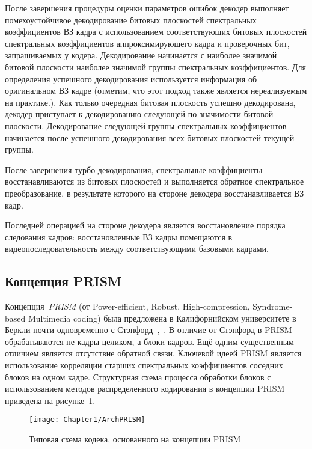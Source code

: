 После завершения процедуры оценки параметров ошибок декодер выполняет помехоустойчивое декодирование битовых плоскостей спектральных коэффициентов ВЗ кадра с использованием соответствующих битовых плоскостей спектральных коэффициентов аппроксимирующего кадра и проверочных бит, запрашиваемых у кодера. Декодирование начинается с наиболее значимой битовой плоскости наиболее значимой группы спектральных коэффициентов. Для определения успешного декодирования используется информация об оригинальном ВЗ кадре (отметим, что этот подход также является нереализуемым на практике.). Как только очередная битовая плоскость успешно декодирована, декодер приступает к декодированию следующей по значимости битовой плоскости. Декодирование следующей группы спектральных коэффициентов начинается после успешного декодирования всех битовых плоскостей текущей группы.

После завершения турбо декодирования, спектральные коэффициенты восстанавливаются из битовых плоскостей и выполняется обратное спектральное преобразование, в результате которого на стороне декодера восстанавливается ВЗ кадр.

Последней операцией на стороне декодера является восстановление порядка следования кадров: восстановленные ВЗ кадры помещаются в видеопоследовательность между соответствующими базовыми кадрами.

\subsection{Концепция PRISM}
\label{chap:1:4:2}

Концепция~\textit{PRISM} (от Power-efficient, Robust, High-compression, Syndrome-based Multimedia coding) была предложена в Калифорнийском университете в Беркли почти одновременно с Стэнфорд~\cite{Puri2003},~\cite{Puri2007}. В отличие от Стэнфорд в PRISM обрабатываются не кадры целиком, а блоки кадров. Ещё одним существенным отличием является отсутствие обратной связи. Ключевой идеей PRISM является использование корреляции старших спектральных коэффициентов соседних блоков на одном кадре. Структурная схема процесса обработки блоков с использованием методов распределенного кодирования в концепции PRISM приведена на рисунке~\ref{fig:ArchPRISM}.

\begin{figure}[htbp]
\begin{center}
\texttt{[image: Chapter1/ArchPRISM]}
\caption{Типовая схема кодека, основанного на концепции PRISM}
\label{fig:ArchPRISM}
\end{center}
\end{figure}

